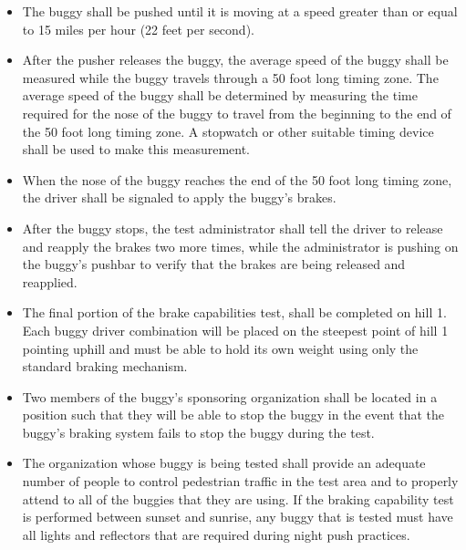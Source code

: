 	\begin{itemize}

		\item
		The buggy shall be pushed until it is moving at a speed greater than or equal
		to 15 miles per hour (22 feet per second).

		\item
		After the pusher releases the buggy, the average speed of the buggy shall be
		measured while the buggy travels through a 50 foot long timing zone. The
		average speed of the buggy shall be determined by measuring the time required
		for the nose of the buggy to travel from the beginning to the end of the 50
		foot long timing zone. A stopwatch or other suitable timing device shall be
		used to make this measurement.

		\item
		When the nose of the buggy reaches the end of the 50 foot long timing zone, the
		driver shall be signaled to apply the buggy's brakes.

		\item
		After the buggy stops, the test administrator shall tell the driver to release
		and reapply the brakes two more times, while the administrator is pushing on
		the buggy's pushbar to verify that the brakes are being released and reapplied.

		\item
		The final portion of the brake capabilities test, shall be completed on hill 1.
		Each buggy driver combination will be placed on the steepest point of hill 1
		pointing uphill and must be able to hold its own weight using only the standard
		braking mechanism.

		\item
		Two members of the buggy's sponsoring organization shall be located in a
		position such that they will be able to stop the buggy in the event that the
		buggy's braking system fails to stop the buggy during the test.
		
		\item
		The organization whose buggy is being tested shall provide an adequate number
		of people to control pedestrian traffic in the test area and to properly attend
		to all of the buggies that they are using. If the braking capability test is
		performed between sunset and sunrise, any buggy that is tested must have all
		lights and reflectors that are required during night push practices.

	\end{itemize}

